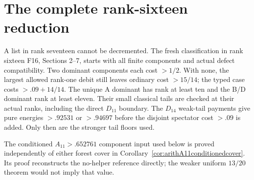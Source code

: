 \documentclass[11pt]{article}
\newcommand{\supp}[1]{\textsf{#1}}
\begin{document}
\section{The complete rank-sixteen reduction}\label{sec:sixteen}

A list in rank seventeen cannot be decremented. The fresh classification in rank sixteen
\supp{F16}, Sections 2--7, starts with all finite components and
actual defect compatibility. Two dominant components each cost
$>1/2$. With none, the largest allowed rank-one debit still leaves
ordinary cost $>15/14$; the typed case costs $>.09+14/14$.
The unique A dominant has rank at least ten and the B/D dominant
rank at least eleven. Their small classical tails are checked at
their actual ranks, including the direct $D_{11}$ boundary.
The $D_{14}$ weak-tail payments give pure energies $>.92531$
or $>.94697$ before the disjoint spectator cost $>.09$ is added.
Only then are the stronger tail floors used.

The conditioned $A_{11}>.652761$ component input used below is proved
independently of either forest cover in
Corollary~\ref{cor:arithA11conditionedcover}. Its proof reconstructs the
no-helper reference directly; the weaker uniform $13/20$ theorem would
not imply that value.
\end{document}
